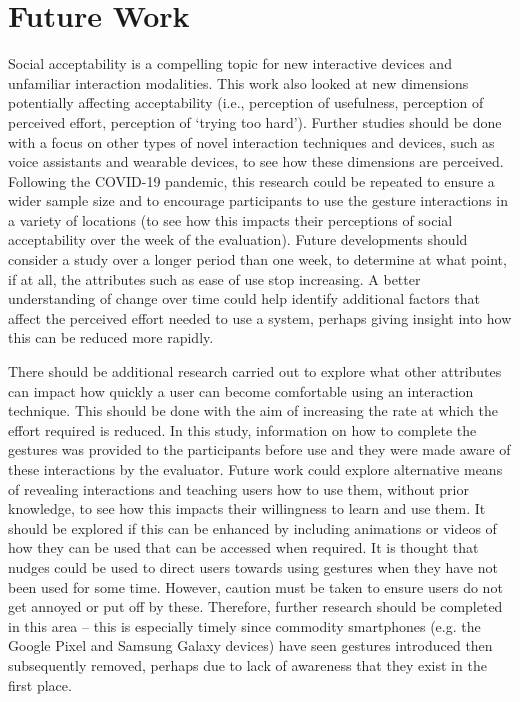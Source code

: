 \documentclass{l4proj}
\begin{document}
\section{Future Work}
Social acceptability is a compelling topic for new interactive devices and unfamiliar interaction modalities. This work also looked at new dimensions potentially affecting acceptability (i.e., perception of usefulness, perception of perceived effort, perception of `trying too hard'). Further studies should be done with a focus on other types of novel interaction techniques and devices, such as voice assistants and wearable devices, to see how these dimensions are perceived. Following the COVID-19 pandemic, this research could be repeated to ensure a wider sample size and to encourage participants to use the gesture interactions in a variety of locations (to see how this impacts their perceptions of social acceptability over the week of the evaluation). Future developments should consider a study over a longer period than one week, to determine at what point, if at all, the attributes such as ease of use stop increasing. A better understanding of change over time could help identify additional factors that affect the perceived effort needed to use a system, perhaps giving insight into how this can be reduced more rapidly. 

There should be additional research carried out to explore what other attributes can impact how quickly a user can become comfortable using an interaction technique. This should be done with the aim of increasing the rate at which the effort required is reduced. In this study, information on how to complete the gestures was provided to the participants before use and they were made aware of these interactions by the evaluator. Future work could explore alternative means of revealing interactions and teaching users how to use them, without prior knowledge, to see how this impacts their willingness to learn and use them. It should be explored if this can be enhanced by including animations or videos of how they can be used that can be accessed when required. It is thought that nudges could be used to direct users towards using gestures when they have not been used for some time. However, caution must be taken to ensure users do not get annoyed or put off by these. Therefore, further research should be completed in this area -- this is especially timely since commodity smartphones (e.g. the Google Pixel and Samsung Galaxy devices) have seen gestures introduced then subsequently removed, perhaps due to lack of awareness that they exist in the first place.
\end{document}
